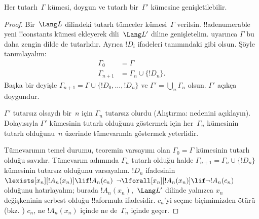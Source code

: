 \documentclass[../../../include/open-logic-section]{subfiles}
\begin{document}
\begin{lem}
Her tutarlı~$\Gamma$ kümesi, doygun ve tutarlı bir~$\Gamma'$ kümesine
genişletilebilir.
\end{lem}

\begin{proof}
Bir~$\Lang L$ dilindeki tutarlı tümceler kümesi~$\Gamma$ verilsin.
!!a{denumerable} yeni !!{constant}s kümesi ekleyerek
dili~$\Lang L'$ diline genişletelim.  uyarınca
$\Gamma$ bu daha zengin dilde de tutarlıdır. Ayrıca $!D_i$ ifadeleri
 tanımındaki gibi olsun. Şöyle tanımlayalım:
\begin{align*}
\Gamma_0 & = \Gamma \\
\Gamma_{n+1} & = \Gamma_n \cup \{!D_n \}.
\end{align*}
Başka bir deyişle $\Gamma_{n+1}=\Gamma\cup\{!D_0,\dots,!D_n\}$ ve
$\Gamma'=\bigcup_n\Gamma_n$ olsun. $\Gamma'$ açıkça doygundur.

$\Gamma'$ tutarsız olsaydı bir~$n$ için $\Gamma_n$ tutarsız olurdu
(Alıştırma: nedenini açıklayın). Dolayısıyla $\Gamma'$ kümesinin
tutarlı olduğunu göstermek için her~$\Gamma_n$ kümesinin tutarlı
olduğunu~$n$ üzerinde tümevarımla göstermek yeterlidir.

Tümevarımın temel durumu, teoremin varsayımı olan $\Gamma_0=\Gamma$
kümesinin tutarlı olduğu savıdır. Tümevarım adımında $\Gamma_n$
tutarlı olduğu halde $\Gamma_{n+1}=\Gamma_n\cup\{!D_n\}$ kümesinin
tutarsız olduğunu varsayalım. $!D_n$ ifadesinin
{$\lexists[x_n][!A_n(x_n)]\lif !A_n(c_n)$}
{$\lnot\lforall[x_n][!A_n(x_n)]\lif\lnot !A_n(c_n)$}
olduğunu hatırlayalım; burada $!A_n(x_n)$,~$\Lang L'$ dilinde yalnızca
$x_n$ değişkeninin serbest olduğu !!a{formula} ifadesidir.
$c_n$'yi seçme biçimimizden ötürü (bkz. )
$c_n$, ne $!A_n(x_n)$ içinde ne de~$\Gamma_n$ içinde geçer.


\end{proof}
\end{document}
